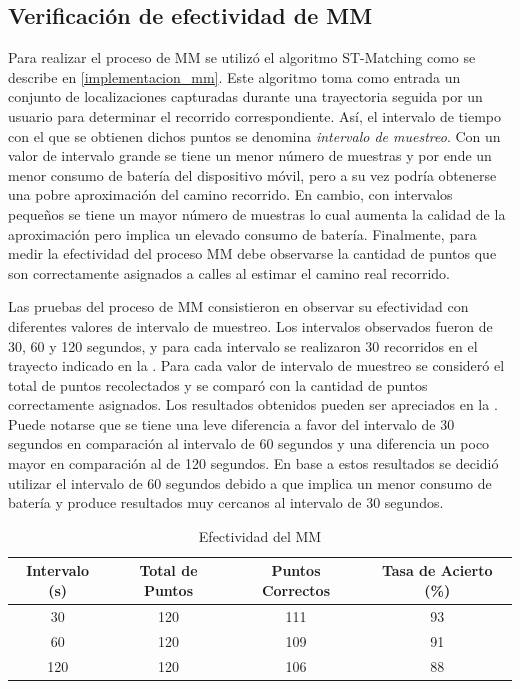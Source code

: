 \subsection{Verificación de efectividad de MM}

Para realizar el proceso de MM se utilizó el algoritmo ST-Matching como se describe en \cref{implementacion_mm}. Este algoritmo toma como entrada un conjunto de localizaciones capturadas durante una trayectoria seguida por un usuario para determinar el recorrido correspondiente. Así, el intervalo de tiempo con el que se obtienen dichos puntos se denomina \emph{intervalo de muestreo}. Con un valor de intervalo grande se tiene un menor número de muestras y por ende un menor consumo de batería del dispositivo móvil, pero a su vez podría obtenerse una pobre aproximación del camino recorrido. En cambio, con intervalos pequeños se tiene un mayor número de muestras lo cual aumenta la calidad de la aproximación pero implica un elevado consumo de batería. Finalmente, para medir la efectividad del proceso MM debe observarse la cantidad de puntos que son correctamente asignados a calles al estimar el camino real recorrido.

Las pruebas del proceso de MM consistieron en observar su efectividad con diferentes valores de intervalo de muestreo. Los intervalos observados fueron de 30, 60 y 120 segundos, y para cada intervalo se realizaron 30 recorridos en el trayecto indicado en la . Para cada valor de intervalo de muestreo se consideró el total de puntos recolectados y se comparó con la cantidad de puntos correctamente asignados. Los resultados obtenidos pueden ser apreciados en la . Puede notarse que se tiene una leve diferencia a favor del intervalo de 30 segundos en comparación al intervalo de 60 segundos y una diferencia un poco mayor en comparación al de 120 segundos. En base a estos resultados se decidió utilizar el intervalo de 60 segundos debido a que implica un menor consumo de batería y produce resultados muy cercanos al intervalo de 30 segundos.

\begin{table}[h]
	\centering
	\begin{tabular}{cccc}
        \toprule
    	Intervalo (s) & Total de Puntos & Puntos Correctos & Tasa de Acierto (\%)\\
    	\midrule
    	30 & 120  & 111 & 93 \\
    	60 & 120 & 109 & 91 \\
    	120 & 120 & 106 & 88 \\ 
    	\bottomrule
	\end{tabular}
	\caption{Efectividad del MM} 
	\label{table:map_matching}
\end{table}

